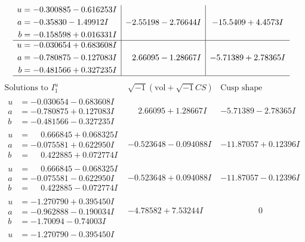 \documentclass[1p]{elsarticle_modified}
\theoremstyle{definition}
\newcommand{\I}{\sqrt{-1}}
\begin{document}
$$\begin{array}{c|c|c}
\begin{aligned}
u &= -0.300885 - 0.616253 I \\
a &= -0.35830 - 1.49912 I \\
b &= -0.158598 + 0.016331 I\end{aligned}
 & -2.55198 - 2.76644 I & -15.5409 + 4.4573 I \\ \hline\begin{aligned}
u &= -0.030654 + 0.683608 I \\
a &= -0.780875 - 0.127083 I \\
b &= -0.481566 + 0.327235 I\end{aligned}
 & \phantom{-}2.66095 - 1.28667 I & -5.71389 + 2.78365 I\\
 \hline 
 \end{array}$$\newpage$$\begin{array}{c|c|c}  
\text{Solutions to }I^u_{1}& \I (\text{vol} + \sqrt{-1}CS) & \text{Cusp shape}\\
 \hline 
\begin{aligned}
u &= -0.030654 - 0.683608 I \\
a &= -0.780875 + 0.127083 I \\
b &= -0.481566 - 0.327235 I\end{aligned}
 & \phantom{-}2.66095 + 1.28667 I & -5.71389 - 2.78365 I \\ \hline\begin{aligned}
u &= \phantom{-}0.666845 + 0.068325 I \\
a &= -0.075581 + 0.622950 I \\
b &= \phantom{-}0.422885 + 0.072774 I\end{aligned}
 & -0.523648 - 0.094088 I & -11.87057 + 0.12396 I \\ \hline\begin{aligned}
u &= \phantom{-}0.666845 - 0.068325 I \\
a &= -0.075581 - 0.622950 I \\
b &= \phantom{-}0.422885 - 0.072774 I\end{aligned}
 & -0.523648 + 0.094088 I & -11.87057 - 0.12396 I \\ \hline\begin{aligned}
u &= -1.270790 + 0.395450 I \\
a &= -0.962888 - 0.190034 I \\
b &= -1.70094 - 0.74003 I\end{aligned}
 & -4.78582 + 7.53244 I & \phantom{-0.000000 } 0 \\ \hline\begin{aligned}
u &= -1.270790 - 0.395450 I \\

\end{aligned}
\end{array}$$
\end{document}
